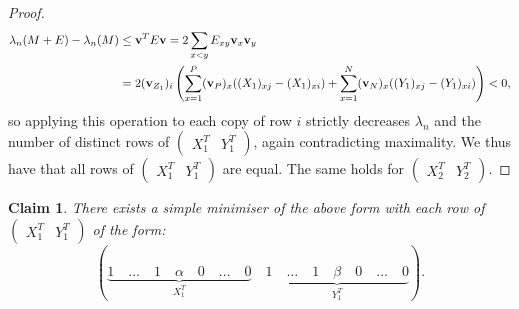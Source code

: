 \documentclass[12pt]{article}
\newtheorem*{claim}{Claim}
\begin{document}
\begin{proof}
    \begin{alignat*}{1}
        \lambda_{n}(M+E) - \lambda_{n}(M) & \le \bold{v}^{T} E\bold{v} = 2\sum_{x<y}  E_{xy}\bold{v}_x\bold{v}_y  \\ 
        & = 2(\bold{v}_{Z_1})_i\left(\sum_{x=1}^{P} (\bold{v}_P)_x ((X_1)_{xj} - (X_1)_{xi}) + \sum_{x=1}^{N} (\bold{v}_N)_x ((Y_1)_{xj} - (Y_1)_{xi})\right)<0,
    \end{alignat*}
    so applying this operation to each copy of row $i$ strictly decreases $\lambda_n$ and the number of distinct rows of $\begin{pmatrix}X_1^T&Y_1^T\end{pmatrix}$, again contradicting maximality. We thus have that all rows of $\begin{pmatrix}X_1^T & Y_1^T \end{pmatrix}$ are equal. The same holds for $\begin{pmatrix}X_2^T & Y_2^T\end{pmatrix}$.
    \end{proof}
\begin{claim} 
    There exists a simple minimiser of the above form with each row of $\begin{pmatrix}X_1^T & Y_1^T\end{pmatrix}$ of the form:
    \[(\underbrace{1 \quad \dots \quad 1 \quad \alpha \quad 0 \quad \dots \quad 0}_{X_1^T} \quad \underbrace{1 \quad \dots \quad 1 \quad \beta \quad 0 \quad \dots \quad 0}_{Y_1^T}).\]
\end{claim}
\end{document}
